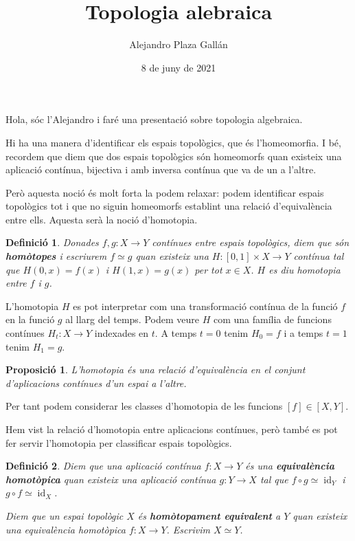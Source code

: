 \documentclass{article}
\title{Topologia alebraica}
\author{Alejandro Plaza Gall\'{a}n}
\date{8 de juny de 2021}
\newtheorem{definicio}{Definici\'{o}}
\newtheorem{proposicio}{Proposici\'{o}}
\theoremstyle{definition}
\DeclareMathOperator{\id}{id}
\begin{document}
\maketitle

Hola, s\'{o}c l'Alejandro i far\'{e} una presentaci\'{o} sobre topologia algebraica.

Hi ha una manera d'identificar els espais topol\`{o}gics, que \'{e}s l'homeomorfia. I b\'{e}, recordem que diem que dos espais topol\`{o}gics s\'{o}n homeomorfs quan existeix una aplicaci\'{o} cont\'{i}nua, bijectiva i amb inversa cont\'{i}nua que va de un a l'altre.

Per\`{o} aquesta noci\'{o} \'{e}s molt forta la podem relaxar: podem identificar espais topol\`{o}gics tot i que no siguin homeomorfs establint una relaci\'{o} d'equival\`{e}ncia entre ells. Aquesta ser\`{a} la noci\'{o} d'homotopia.

\begin{definicio}
Donades $f,g:X\rightarrow Y$ cont\'{i}nues entre espais topol\`{o}gics, diem que s\'{o}n \textbf{hom\`{o}topes} i escriurem $f\simeq g$ quan existeix una $H:[0,1]\times X\rightarrow Y$ cont\'{i}nua tal que $H(0,x)=f(x)$ i $H(1,x)=g(x)$ per tot $x\in X$. $H$ es diu homotopia entre $f$ i $g$.
\end{definicio}

L'homotopia $H$ es pot interpretar com una transformaci\'{o} cont\'{i}nua de la funci\'{o} $f$ en la funci\'{o} $g$ al llarg del temps. Podem veure $H$ com una fam\'{i}lia de funcions cont\'{i}nues $H_t:X\rightarrow Y$ indexades en $t$. A temps $t=0$ tenim $H_0=f$ i a temps $t=1$ tenim $H_1=g$.

\begin{proposicio}
L'homotopia \'{e}s una relaci\'{o} d'equival\`{e}ncia en el conjunt d'aplicacions cont\'{i}nues d'un espai a l'altre.
\end{proposicio}

Per tant podem considerar les classes d'homotopia de les funcions $[f]\in[X,Y]$.

Hem vist la relaci\'{o} d'homotopia entre aplicacions cont\'{i}nues, per\`{o} tamb\'{e} es pot fer servir l'homotopia per classificar espais topol\`{o}gics.

\begin{definicio}
Diem que una aplicaci\'{o} cont\'{i}nua $f:X\rightarrow Y$ \'{e}s una \textbf{equival\`{e}ncia homot\`{o}pica} quan existeix una aplicaci\'{o} cont\'{i}nua $g:Y\rightarrow X$ tal que $f\circ g\simeq\id_Y$ i $g\circ f\simeq\id_X$.

Diem que un espai topol\`{o}gic $X$ \'{e}s \textbf{hom\`{o}topament equivalent} a $Y$ quan existeix una equival\`{e}ncia homot\`{o}pica $f:X\rightarrow Y$. Escrivim $X\simeq Y$.
\end{definicio}
\end{document}
